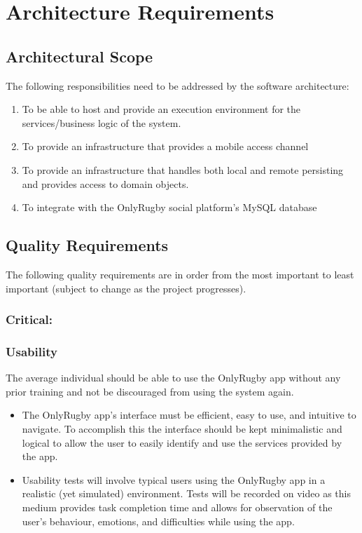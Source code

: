 \documentclass[hidelinks,a4paper,12pt]{article}
\begin{document}
\section{Architecture Requirements}
	\subsection{Architectural Scope}
	The following responsibilities need to be addressed by the software architecture:
	\begin{enumerate}
		\item To be able to host and provide an execution environment for the services/business logic of the system.
		\item To provide an infrastructure that provides a mobile access channel
		\item To provide an infrastructure that handles both local and remote persisting and provides access to domain objects.
		\item To integrate with the OnlyRugby social platform's MySQL database
	\end{enumerate}
\newpage
\subsection{Quality Requirements}
	The following quality requirements are in order from the most important to least important (subject to change as the project progresses).	
	\subsubsection{Critical:}
	\subsubsection*{Usability}
	The average individual should be able to use the OnlyRugby app without any prior training and not be discouraged from using the system again.
	\begin{itemize}
		\item The OnlyRugby app's interface must be efficient, easy to use, and intuitive to navigate. To accomplish this the interface should be kept minimalistic and logical to allow the user to easily identify and use the services provided by the app.
		\item Usability tests will involve typical users using the OnlyRugby app in a realistic (yet simulated) environment. Tests will be recorded on video as this medium provides task completion time and allows for observation of the user's behaviour, emotions, and difficulties while using the app.
	\end{itemize}
	
\end{document}
